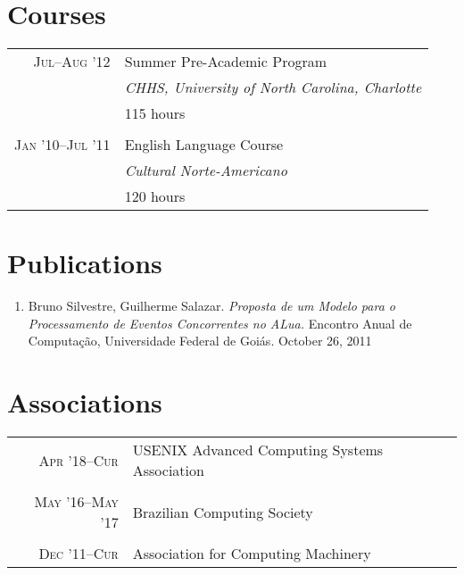 \documentclass[a4paper,10pt]{article}
\begin{document}
\section{Courses}

\begin{tabular}{r|p{11cm}}

  \textsc{Jul--Aug '12} & Summer Pre-Academic Program\\ &
  \emph{CHHS, University of North Carolina, Charlotte}\\ & 115 hours
  \\\multicolumn{2}{c}{} \\

  \textsc{Jan '10--Jul '11} & English Language Course\\ &
  \emph{Cultural Norte-Americano} \\ & 120 hours\\

\end{tabular}

\section{Publications}
\begin{enumerate}
  \renewcommand{\labelenumi}{[\arabic{enumi}] }
  \item Bruno Silvestre, Guilherme Salazar. \emph{Proposta de um Modelo para o
        Processamento de Eventos Concorrentes no ALua.} Encontro Anual de
        Computação, Universidade Federal de Goiás. October 26, 2011
\end{enumerate}

\section{Associations}

\begin{tabular}{r|p{11cm}}

  \textsc{Apr '18--Cur}
  & USENIX Advanced Computing Systems Association \\
  \multicolumn{2}{c}{}\\

  \textsc{May '16--May '17}
  & Brazilian Computing Society\\
  \multicolumn{2}{c}{}\\

  \textsc{Dec '11--Cur}
  & Association for Computing Machinery\\

\end{tabular}
\end{document}
